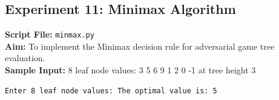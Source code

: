 \subsection*{Experiment 11: Minimax Algorithm}
\textbf{Script File:} \texttt{minmax.py} \\[4pt]
\textbf{Aim:} To implement the Minimax decision rule for adversarial game tree evaluation. \\[4pt]
\textbf{Sample Input:} 8 leaf node values: 3 5 6 9 1 2 0 -1 at tree height 3 \\[6pt]
\begin{tcolorbox}[colback=black!5!white,colframe=black!75!white,title=Terminal Execution Output - Minimax Algorithm]
\begin{verbatim}
Enter 8 leaf node values: The optimal value is: 5
\end{verbatim}
\end{tcolorbox}

